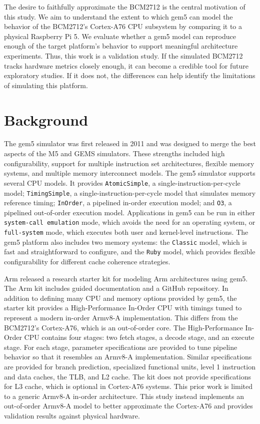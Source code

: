 \documentclass[acmlarge]{acmart}
\begin{document}
The desire to faithfully approximate the BCM2712 is the central motivation of
this study. We aim to understand the extent to which gem5 can model the behavior
of the BCM2712's Cortex-A76 CPU subsystem by comparing it to a physical
Raspberry Pi 5. We evaluate whether a gem5 model can reproduce enough of the
target platform's behavior to support meaningful architecture experiments. Thus,
this work is a validation study. If the simulated BCM2712 tracks hardware metrics
closely enough, it can become a credible tool for future exploratory studies. If
it does not, the differences can help identify the limitations of simulating this
platform.

\section{Background}
The gem5 simulator was first released in 2011 and was designed to merge the best
aspects of the M5 and GEMS simulators\cite{Binkert2011-oh}. These strengths
included high configurability, support for multiple instruction set
architectures, flexible memory systems, and multiple memory interconnect models.
The gem5 simulator supports several CPU models. It provides \texttt{AtomicSimple},
a single-instruction-per-cycle model; \texttt{TimingSimple}, a
single-instruction-per-cycle model that simulates memory reference timing;
\texttt{InOrder}, a pipelined in-order execution model; and \texttt{O3}, a
pipelined out-of-order execution model. Applications in gem5 can be run in either
\texttt{system-call emulation} mode, which avoids the need for an operating
system, or \texttt{full-system} mode, which executes both user and kernel-level
instructions. The gem5 platform also includes two memory systems: the
\texttt{Classic} model, which is fast and straightforward to configure, and the
\texttt{Ruby} model, which provides flexible configurability for different cache
coherence strategies.

Arm released a research starter kit for modeling Arm architectures using
gem5\cite{githubGitHubArmeducationarmgem5rsk}. The Arm kit includes guided
documentation and a GitHub repository. In addition to defining many CPU and
memory options provided by gem5, the starter kit provides a High-Performance
In-Order CPU with timings tuned to represent a modern in-order Armv8-A
implementation. This differs from the BCM2712's Cortex-A76, which is an
out-of-order core. The High-Performance In-Order CPU contains four stages: two
fetch stages, a decode stage, and an execute stage. For each stage, parameter
specifications are provided to tune pipeline behavior so that it resembles an
Armv8-A implementation. Similar specifications are provided for branch
prediction, specialized functional units, level 1 instruction and data caches,
the TLB, and L2 cache. The kit does not provide specifications for L3 cache,
which is optional in Cortex-A76 systems\cite{armCompare}. This prior work is
limited to a generic Armv8-A in-order architecture. This study instead implements
an out-of-order Armv8-A model to better approximate the Cortex-A76\cite{armCortexA76Product}
and provides validation results against physical hardware.
\end{document}
